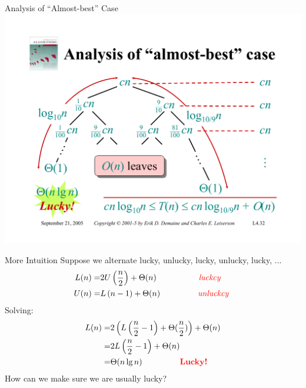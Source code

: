 \documentclass{beamer}
\begin{document}
\begin{frame}{Analysis of ``Almost-best'' Case}
    \centering
    \includegraphics[width=\textwidth, trim={1.00cm 1.50cm 1.00cm 4.25cm}, clip]{pages/lec4_32}
\end{frame}

\begin{frame}{More Intuition}
    Suppose we alternate lucky, unlucky, lucky, unlucky, lucky, ...
    \begin{equation*}
        \begin{split}
            L(n) =& 2U\left(\frac{n}{2}\right) + \Theta(n) \text{\hspace{17mm} \textcolor{red}{\textit{luckcy}} } \\
            U(n) =& L\left(n - 1\right) + \Theta(n) \text{\hspace{15mm} \textcolor{red}{\textit{unluckcy}} } \\
        \end{split}
    \end{equation*}
    Solving:
    \begin{equation*}
        \begin{split}
            L(n) =& 2\left(L\left(\frac{n}{2} - 1 \right) + \Theta(\frac{n}{2})\right) + \Theta(n) \\
                 =& 2L\left(\frac{n}{2} - 1 \right) + \Theta(n) \\
                 =& \Theta(n \lg n) \text{\hspace{15mm} \textbf{\textcolor{red}{Lucky!}}}
        \end{split}
    \end{equation*}
    How can we make sure we are usually lucky?
\end{frame}
\end{document}
